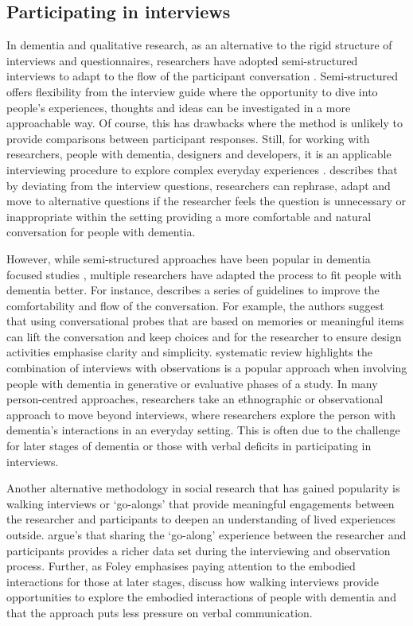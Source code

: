 \subsection{Participating in interviews}
\label{PD:Interviews}
In dementia and qualitative research, as an alternative to the rigid structure of interviews and questionnaires, researchers have adopted semi-structured interviews to adapt to the flow of the participant conversation \citep{cheston2000involving}. Semi-structured offers flexibility from the interview guide where the opportunity to dive into people’s experiences, thoughts and ideas can be investigated in a more approachable way. Of course, this has drawbacks where the method is unlikely to provide comparisons between participant responses. Still, for working with researchers, people with dementia, designers and developers, it is an applicable interviewing procedure to explore complex everyday experiences \citep{horton2004qualitative}. \cite{samsi2020interviewing} describes that by deviating from the interview questions, researchers can rephrase, adapt and move to alternative questions if the researcher feels the question is unnecessary or inappropriate within the setting providing a more comfortable and natural conversation for people with dementia.

However, while semi-structured approaches have been popular in dementia focused studies \citep{samsi_everyday_2013}, multiple researchers have adapted the process to fit people with dementia better. For instance, \cite{mayer2013lessons} describes a series of guidelines to improve the comfortability and flow of the conversation. For example, the authors suggest that using conversational probes that are based on memories or meaningful items can lift the conversation and keep choices and for the researcher to ensure design activities emphasise clarity and simplicity. \cite{suijkerbuijk_active_2019} systematic review highlights the combination of interviews with observations is a popular approach when involving people with dementia in generative or evaluative phases of a study. In many person-centred approaches, researchers take an ethnographic or observational approach to move beyond interviews, where researchers explore the person with dementia's interactions in an everyday setting. This is often due to the challenge for later stages of dementia or those with verbal deficits in participating in interviews.

Another alternative methodology in social research that has gained popularity is walking interviews or `go-alongs' that provide meaningful engagements between the researcher and participants to deepen an understanding of lived experiences outside. \cite{hein2008mobile} argue's that sharing the `go-along' experience between the researcher and participants provides a richer data set during the interviewing and observation process. Further, as Foley emphasises paying attention to the embodied interactions for those at later stages, \cite{kullberg2017walking}  discuss how walking interviews provide opportunities to explore the embodied interactions of people with dementia and that the approach puts less pressure on verbal communication. 

